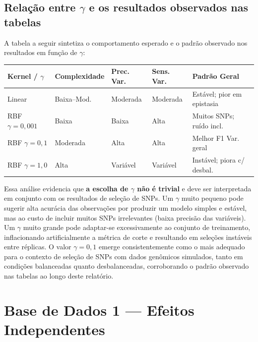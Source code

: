 \documentclass[
    12pt,
    a4paper,
    oneside,
    english,
    french,
    spanish,
    brazil
    ]{abntex2}
\renewcommand{\arraystretch}{1.3}
\newcommand{\novo}[1]{\textcolor{corNova}{#1}}
\begin{document}
\section*{Relação entre $\gamma$ e os resultados observados nas tabelas}

\novo{A tabela a seguir sintetiza o comportamento esperado e o padrão observado nos resultados em função de $\gamma$:}

\begin{center}
\footnotesize
\setlength{\tabcolsep}{4pt}
\renewcommand{\arraystretch}{1.4}
\begin{tabular}{L{2.5cm}|C{2.2cm}|C{2.2cm}|C{2.2cm}|C{3.0cm}}
  \textbf{Kernel / $\gamma$} & \textbf{Complexidade} & \textbf{Prec. Var.} & \textbf{Sens. Var.} & \textbf{Padrão Geral} \\
  \hline
  Linear & Baixa--Mod. & Moderada & Moderada & Estável; pior em epistasia \\
  \hline
  RBF $\gamma=0{,}001$ & Baixa & Baixa & Alta & Muitos SNPs; ruído incl. \\
  \hline
  RBF $\gamma=0{,}1$ & Moderada & Alta & Alta & Melhor F1 Var. geral \\
  \hline
  RBF $\gamma=1{,}0$ & Alta & Variável & Variável & Instável; piora c/ desbal. \\
\end{tabular}
\end{center}
\renewcommand{\arraystretch}{1.3}

\novo{Essa análise evidencia que \textbf{a escolha de $\gamma$ não é trivial} e deve ser interpretada em conjunto com os resultados de seleção de SNPs. Um $\gamma$ muito pequeno pode sugerir alta acurácia das observações por produzir um modelo simples e estável, mas ao custo de incluir muitos SNPs irrelevantes (baixa precisão das variáveis). Um $\gamma$ muito grande pode adaptar-se excessivamente ao conjunto de treinamento, inflacionando artificialmente a métrica de corte e resultando em seleções instáveis entre réplicas. O valor $\gamma = 0{,}1$ emerge consistentemente como o mais adequado para o contexto de seleção de SNPs com dados genômicos simulados, tanto em condições balanceadas quanto desbalanceadas, corroborando o padrão observado nas tabelas ao longo deste relatório.}

\chapter{Base de Dados 1 --- Efeitos Independentes}
\end{document}
